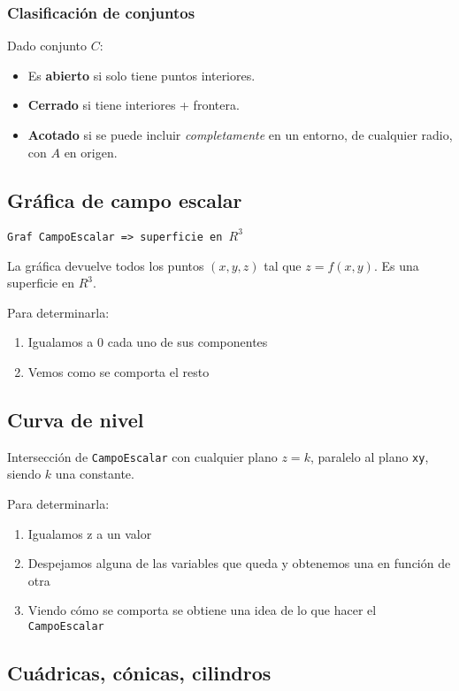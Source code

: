 \subsubsection{Clasificación de conjuntos}

Dado conjunto \(C\):

\begin{itemize}
    \item Es \textbf{abierto} si solo tiene puntos interiores.
    \item \textbf{Cerrado} si tiene interiores + frontera.
    \item \textbf{Acotado} si se puede incluir \textit{completamente} en un entorno, de cualquier radio,
    con \(A\) en origen.
\end{itemize}

\subsection{Gráfica de campo escalar}

\texttt{Graf CampoEscalar => superficie en \(R^{3}\)}

La gráfica devuelve todos los puntos \((x,y,z)\) tal que \(z = f(x,y)\).
Es una superficie en \(R^{3}\).

Para determinarla:

\begin{enumerate}
    \item Igualamos a 0 cada uno de sus componentes
    \item Vemos como se comporta el resto
\end{enumerate}

\subsection{Curva de nivel}

Intersección de \texttt{CampoEscalar} con cualquier plano \(z = k\),
paralelo al plano \texttt{xy}, siendo \(k\) una constante.

Para determinarla:

\begin{enumerate}
    \item Igualamos z a un valor
    \item Despejamos alguna de las variables que queda y obtenemos una en función de otra
    \item Viendo cómo se comporta se obtiene una idea de lo que hacer el \texttt{CampoEscalar}
\end{enumerate}

\subsection{Cuádricas, cónicas, cilindros}


